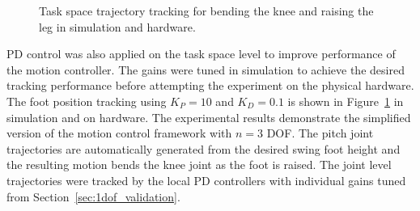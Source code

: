 \begin{figure}[!t]
	\begin{center}
	\end{center}
  	\caption{Task space trajectory tracking for bending the knee and raising the leg in simulation and hardware.}
	\label{fig:kneebendp}
\end{figure} 

PD control was also applied on the task space level to improve performance of the motion controller. The gains were tuned in simulation to achieve the desired tracking performance before attempting the experiment on the physical hardware. The foot position tracking using $K_P = 10$ and $K_D = 0.1$ is shown in Figure~\ref{fig:kneebendp} in simulation and on hardware. The experimental  results demonstrate the simplified version of the motion control framework with $n = 3$ DOF. The pitch joint trajectories are automatically generated from the desired swing foot height and the resulting motion bends the knee joint as the foot is raised. The joint level trajectories were tracked by the local PD controllers with individual gains tuned from Section~\ref{sec:1dof_validation}. 


